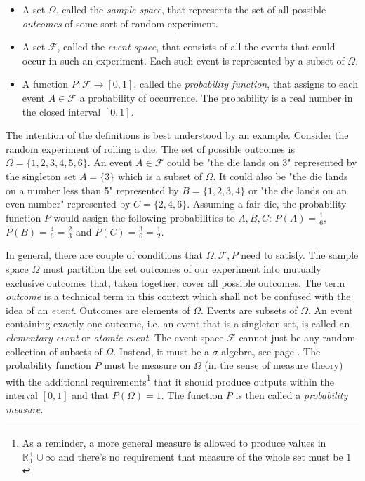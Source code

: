 \begin{itemize}

\item 
A set $\Omega$, called the \emph{sample space}, that represents the set of all possible \emph{outcomes} of some sort of random experiment.

\item
A set $\mathcal{F}$, called the \emph{event space}, that consists of all the events that could occur in such an experiment. Each such event is represented by a subset of $\Omega$.

\item 
A function $P: \mathcal{F} \rightarrow [0,1]$, called the \emph{probability function}, that assigns to each event $A \in \mathcal{F}$ a probability of occurrence. The probability is a real number in the closed interval $[0,1]$.

\end{itemize}

The intention of the definitions is best understood by an example. Consider the random experiment of rolling a die. The set of possible outcomes is $\Omega = \{1,2,3,4,5,6\}$. An event $A \in \mathcal{F}$ could be "the die lands on 3" represented by the singleton set $A = \{3\}$ which is a subset of $\Omega$. It could also be "the die lands on a number less than 5" represented by $B = \{1,2,3,4\}$ or "the die lands on an even number" represented by $C = \{2,4,6\}$. Assuming a fair die, the probability function $P$ would assign the following probabilities to $A,B,C$: $P(A) = \frac{1}{6}$, $P(B) = \frac{4}{6} = \frac{2}{3}$ and  $P(C) = \frac{3}{6} = \frac{1}{2}$.

\medskip
In general, there are couple of conditions that $\Omega, \mathcal{F}, P$ need to satisfy. The sample space $\Omega$ must partition the set outcomes of our experiment into mutually exclusive outcomes that, taken together, cover all possible outcomes. The term \emph{outcome} is a technical term in this context which shall not be confused with the idea of an \emph{event}. Outcomes are elements of $\Omega$. Events are subsets of $\Omega$. An event containing exactly one outcome, i.e. an event that is a singleton set, is called an \emph{elementary event} or \emph{atomic event}. The event space $\mathcal{F}$ cannot just be any random collection of subsets of $\Omega$. Instead, it must be a $\sigma$-algebra, see page \pageref{Def:SigmaAlgebra}. The probability function $P$ must be measure on $\Omega$ (in the sense of measure theory) with the additional requirements\footnote{As a reminder, a more general measure is allowed to produce values in $\mathbb{R}^+_0 \cup \infty$ and there's no requirement that measure of the whole set must be $1$} that it should produce outputs within the interval $[0,1]$ and that $P(\Omega) = 1$. The function $P$ is then called a \emph{probability measure}.


